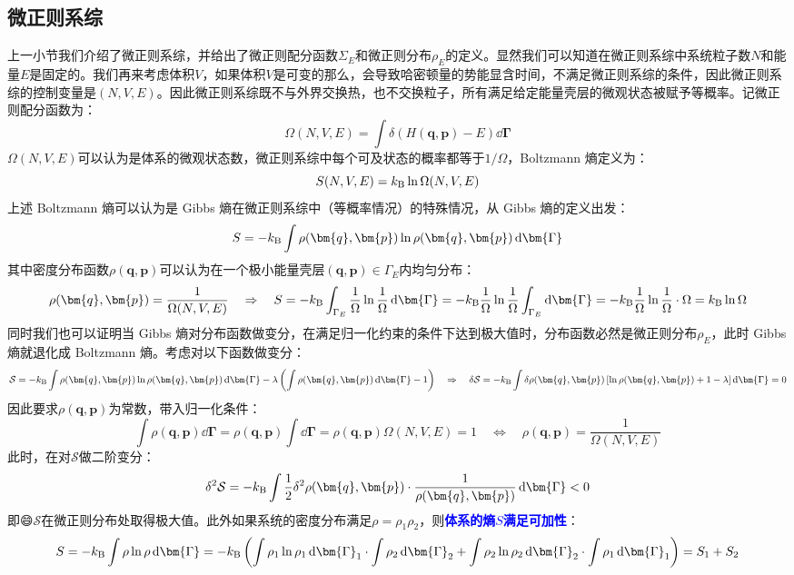 \subsection{微正则系综}
上一小节我们介绍了微正则系综，并给出了微正则配分函数$\Sigma_E$和微正则分布$\rho_E$的定义。显然我们可以知道在微正则系综中系统粒子数$N$和能量$E$是固定的。我们再来考虑体积$V$，如果体积$V$是可变的那么，会导致哈密顿量的势能显含时间，不满足微正则系综的条件，因此微正则系综的控制变量是$(N,V,E)$。因此微正则系综既不与外界交换热，也不交换粒子，所有满足给定能量壳层的微观状态被赋予等概率。记微正则配分函数为：
\[\Omega(N,V,E)=\int\delta(H(\bm{q},\bm{p})-E)\dd{\bm{\Gamma}}\]
$\Omega(N,V,E)$可以认为是体系的微观状态数，微正则系综中每个可及状态的概率都等于$1/\Omega$，Boltzmann 熵定义为：
\[S(N,V,E)=k_{\rm B}\ln \Omega(N,V,E)\]
上述 Boltzmann 熵可以认为是 Gibbs 熵在微正则系综中（等概率情况）的特殊情况，从 Gibbs 熵的定义出发：
\[S=-k_{\rm B}\int\rho(\bm{q},\bm{p})\ln\rho(\bm{q},\bm{p})\dd{\bm{\Gamma}}\]
其中密度分布函数$\rho(\bm{q},\bm{p})$可以认为在一个极小能量壳层$(\bm{q},\bm{p})\in \Gamma_{E}$内均匀分布：
\[\rho(\bm{q},\bm{p})=\frac{1}{\Omega(N,V,E)} \quad \Rightarrow \quad 
S=-k_{\rm B}\int_{\Gamma_{E}}\frac{1}{\Omega}\ln\frac{1}{\Omega}\dd{\bm{\Gamma}}=-k_{\rm B}\frac{1}{\Omega}\ln\frac{1}{\Omega}\int_{\Gamma_{E}}\dd{\bm{\Gamma}}=-k_{\rm B}\frac{1}{\Omega}\ln\frac{1}{\Omega}\cdot \Omega=k_{\rm B}\ln\Omega\]
同时我们也可以证明当 Gibbs 熵对分布函数做变分，在满足归一化约束的条件下达到极大值时，分布函数必然是微正则分布$\rho_E$，此时 Gibbs 熵就退化成 Boltzmann 熵。考虑对以下函数做变分：
\[\mathcal{S}=-k_{\rm B}\int\rho(\bm{q},\bm{p})\ln\rho(\bm{q},\bm{p})\dd{\bm{\Gamma}}-\lambda\left(\int\rho(\bm{q},\bm{p})\dd{\bm{\Gamma}}-1\right) \quad \Rightarrow \quad \delta\mathcal{S}=-k_{\rm B}\int\delta\rho(\bm{q},\bm{p})\left[\ln\rho(\bm{q},\bm{p})+1-\lambda\right]\dd{\bm{\Gamma}}=0\]
因此要求$\rho(\bm{q},\bm{p})$为常数，带入归一化条件：
\[\int \rho(\bm{q},\bm{p}) \dd{\bm{\Gamma}} = \rho(\bm{q},\bm{p})\int \dd{\bm{\Gamma}} = \rho(\bm{q},\bm{p})\Omega(N,V,E) = 1 \quad \Leftrightarrow \quad \rho(\bm{q},\bm{p}) = \frac{1}{\Omega(N,V,E)}\]
此时，在对$\mathcal{S}$做二阶变分：
\[\delta^2\mathcal{S}=-k_{\rm B}\int\frac{1}{2}\delta^2\rho(\bm{q},\bm{p})\cdot\frac{1}{\rho(\bm{q},\bm{p})}\dd{\bm{\Gamma}}<0\]
即😄$\mathcal{S}$在微正则分布处取得极大值。此外如果系统的密度分布满足$\rho=\rho_1\rho_2$，则\textcolor{blue}{\textbf{体系的熵$S$满足可加性}}：
\[S=-k_{\rm B}\int\rho\ln\rho\dd{\bm{\Gamma}}=-k_{\rm B}\left(\int\rho_1\ln\rho_1\dd{\bm{\Gamma}_1}\cdot\int\rho_2\dd{\bm{\Gamma}_2}+\int\rho_2\ln\rho_2\dd{\bm{\Gamma}_2}\cdot\int\rho_1\dd{\bm{\Gamma}_1}\right)=S_1+S_2\]

